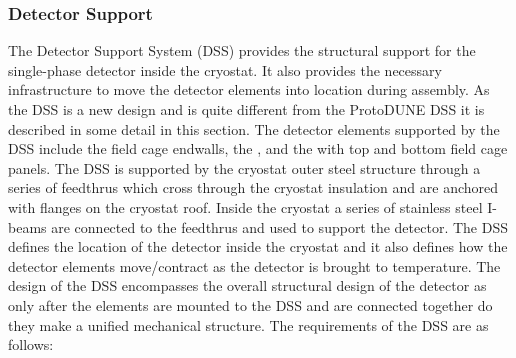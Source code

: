 \subsubsection{Detector Support}

The Detector Support System (DSS) provides the structural support 
for the single-phase detector inside the cryostat.  It also provides the necessary infrastructure to move the detector elements into location during assembly. As the DSS is a new design and is quite different from the ProtoDUNE DSS it is described in some detail in this section. The detector elements supported by the
DSS include the field cage endwalls, the , and
the  with top and bottom field cage panels.  The DSS is
supported by the cryostat outer steel structure through a series of
feedthrus which cross through the cryostat insulation and are anchored
with flanges on the cryostat roof. Inside the cryostat a series of
stainless steel I-beams are connected to the feedthrus and used to
support the detector. The DSS defines the location of the detector
inside the cryostat and it also defines how the detector elements move/contract
as the detector is brought to  temperature. The design of the DSS
encompasses the overall structural design of the detector as only
after the elements are mounted to the DSS and are connected together
do they make a unified mechanical structure. The requirements of the
DSS are as follows:
%
